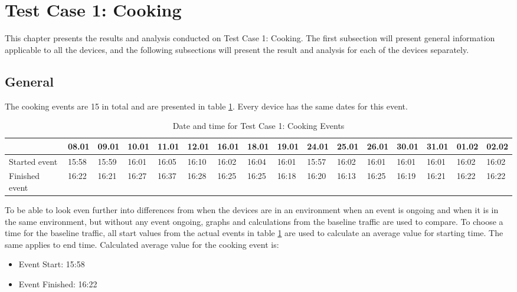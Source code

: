 \section{Test Case 1: Cooking}
This chapter presents the results and analysis conducted on Test Case 1: Cooking. The first subsection will present general information applicable to all the devices, and the following subsections will present the result and analysis for each of the devices separately. 
\subsection{General}
The cooking events are 15 in total and are presented in table \ref{tab:CookingDates}. Every device has the same dates for this event. 
\begin{table}[!hbtp]
    \centering
    \caption{Date and time for Test Case 1: Cooking Events}
    \begin{adjustbox}{width=1\textwidth}
            \begin{tabular}{l|l|l|l|l|l|l|l|l|l|l|l|l|l|l|l|}
            \cline{2-16} 
            & 08.01 & 09.01 & 10.01 & 11.01 & 12.01 & 16.01 & 18.01 & 19.01 & 24.01 & 25.01 & 26.01 & 30.01 & 31.01 & 01.02 & 02.02 \\
            \hline
            \multicolumn{1}{|l|}{Started event}  & 15:58 & 15:59 & 16:01 & 16:05 & 16:10 & 16:02 & 16:04 & 16:01 & 15:57 & 16:02 & 16:01 & 16:01 & 16:01 & 16:02 & 16:02 \\ 
            \hline
            \multicolumn{1}{|l|}{Finished event} & 16:22 & 16:21 & 16:27 & 16:37 & 16:28 & 16:25 & 16:25 & 16:18 & 16:20 & 16:13 & 16:25 & 16:19 & 16:21 & 16:22 & 16:22 \\ 
            \hline
            \end{tabular}
    \end{adjustbox}
    \label{tab:CookingDates}
\end{table}
\FloatBarrier

To be able to look even further into differences from when the devices are in an environment when an event is ongoing and when it is in the same environment, but without any event ongoing, graphs and calculations from the baseline traffic are used to compare. To choose a time for the baseline traffic, all start values from the actual events in table \ref{tab:CookingDates} are used to calculate an average value for starting time. The same applies to end time. Calculated average value for the cooking event is:

\begin{itemize}
    \item Event Start: 15:58
    \item Event Finished: 16:22
\end{itemize}
\newpage

